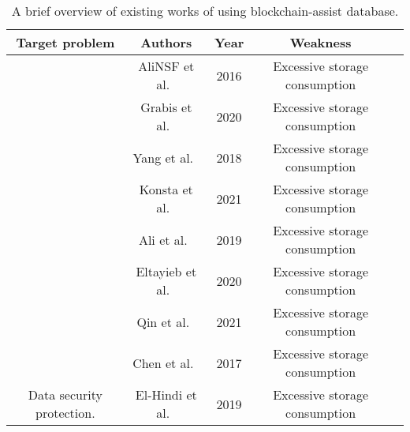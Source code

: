 \documentclass[acmsmall]{acmart}
\begin{document}
   \begin{table*}
   \caption{A brief overview of existing works of using blockchain-assist database.}
    \label{tab:application}
    \begin{tabular}{ccccc}
\toprule
  Target problem                                                      &  Authors                                                                          &  Year                         &  Weakness                                                                                                    \\\midrule


                                                             &  AliNSF et al.~\cite{DBLP:conf/usenix/AliNSF16}                            &  2016                         &   Excessive storage consumption                                       \\ 
                                                             &  Grabis et al.~\cite{DBLP:conf/icde/GrabisSZ20}                            &  2020                         &   Excessive storage consumption                                       \\ 
                                                             &  Yang et al.~\cite{DBLP:journals/jsa/YangLW18}                            &  2018                         &   Excessive storage consumption                                       \\ 
                                                            &  Konsta et al.~\cite{DBLP:conf/icde/KonstaMDNK21}                           &  2021                         &   Excessive storage consumption                                       \\ 
                                                             &  Ali et al.~\cite{DBLP:journals/jsa/AliGAL19}                            &  2019                         &   Excessive storage consumption                                       \\ 
                                                      &  Eltayieb et al.~\cite{DBLP:journals/jsa/EltayiebEHL20}                            &  2020                         &   Excessive storage consumption                                       \\ 
                                                      &  Qin et al.~\cite{DBLP:journals/jsa/QinHYL21}                            &  2021                         &   Excessive storage consumption                                       \\ 
                                           &  Chen et al.~\cite{chen2017improved}                            &  2017                         &  Excessive storage consumption                                                                                \\ 
 \multirow{-9}{*}{ Data security protection.}            & El-Hindi et al.~\cite{el2019blockchaindb}                         &  2019                &   Excessive storage consumption                                         \\ \cline{1-4} 





\end{tabular}
\end{table*}
\end{document}
